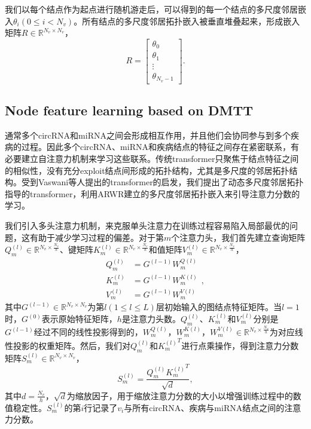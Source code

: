 \documentclass{bioinfo}
\begin{document}
\begin{methods}
我们以每个结点作为起点进行随机游走后，可以得到的每一个结点的多尺度邻居嵌入$\theta _i$$(0\leqslant i<N_v)$。所有结点的多尺度邻居拓扑嵌入被垂直堆叠起来，形成嵌入矩阵$R \in \mathbb{R}^{N_v\times N_v}$，
\begin{equation}
	R = \left[\begin{array}{cccc}
		\theta _0\\
		\theta _1\\
		\vdots\\
		\theta _{N_v-1}
	\end{array}\right].
\end{equation}


\vspace{0.1cm}


\subsection{Node feature learning based on DMTT}
通常多个circRNA和miRNA之间会形成相互作用，并且他们会协同参与到多个疾病的过程。因此多个circRNA、miRNA和疾病结点的特征之间存在紧密联系，有必要建立自注意力机制来学习这些联系。传统transformer只聚焦于结点特征之间的相似性，没有充分exploit结点间形成的拓扑结构，尤其是多尺度的邻居拓扑结构。受到Vaswani等人\cite{vaswani2017attention}提出的transformer的启发，我们提出了动态多尺度邻居拓扑指导的transformer，利用ARWR建立的多尺度邻居拓扑嵌入来引导注意力分数的学习。

我们引入多头注意力机制，来克服单头注意力在训练过程容易陷入局部最优的问题，这有助于减少学习过程的偏差。对于第$m$个注意力头，我们首先建立查询矩阵$Q_{m}^{(l)} \in \mathbb{R}^{N_v \times \frac{N_v}{h}}$、键矩阵$K_{m}^{(l)} \in \mathbb{R}^{N_v \times \frac{N_v}{h}}$和值矩阵$V_{m}^{(l)} \in \mathbb{R}^{N_v \times \frac{N_v}{h}}$，
\begin{equation}
	\begin{aligned}
		{Q_{m}^{(l)}} &= G^{{(l - 1)}}{W_{m}^{Q{(l)}}} \\
		{K_{m}^{(l)}} &= G^{{(l - 1)}}{W_{m}^{K{(l)}}} \ \ ,\\
		{V_{m}^{(l)}} &= G^{(l - 1)}{W_{m}^{V{(l)}}}
	\end{aligned}
\end{equation}
其中$G^{(l - 1)} \in \mathbb{R}^{N_v \times N_v}$为第$l(1\leqslant l\leqslant L)$层初始输入的图结点特征矩阵。当$l = 1$时，$G^{(0)}$表示原始特征矩阵，$h$是注意力头数。$Q_{m}^{(l)}$、$K_{m}^{(l)}$和$V_{m}^{(l)}$分别是$G^{(l - 1)}$经过不同的线性投影得到的，$W_{m}^{Q{(l)}}$，$W_{m}^{K{(l)}}$，$W_{m}^{V(l)} \in \mathbb{R}^{N_v \times \frac{N_v}{h}}$为对应线性投影的权重矩阵。然后，我们对$Q_{m}^{(l)}$和${K_{m}^{(l)}}^T$进行点乘操作，得到注意力分数矩阵${S_{m}^{(l)}} \in \mathbb{R}^{N_v \times N_v}$，
\begin{equation}
	{S_{m}^{(l)}} = \frac{Q_{m}^{(l)}{K_{m}^{(l)}}^T}{\sqrt{d} },
\end{equation}
其中$d = \frac{N_v}{h}$，$\sqrt{d}$为缩放因子，用于缩放注意力分数的大小以增强训练过程中的数值稳定性。$S_{m}^{(l)}$的第$i$行记录了$v_i$与所有circRNA、疾病与miRNA结点之间的注意力分数。


\end{methods}
\end{document}
